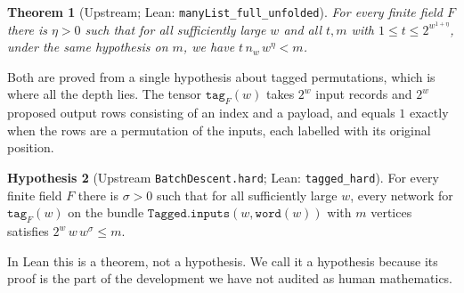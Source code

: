 \documentclass[11pt]{amsart}
\newtheorem{theorem}{Theorem}[section]
\theoremstyle{definition}
\newtheorem{hypothesis}[theorem]{Hypothesis}
\theoremstyle{remark}
\newcommand{\lean}[1]{\texttt{#1}}
\begin{document}
\begin{theorem}[Upstream; Lean: \lean{manyList\_full\_unfolded}]
For every finite field $F$ there is $\eta>0$ such that for all sufficiently large $w$ and all $t,m$ with $1\le t\le 2^{w^{1+\eta}}$, under the same hypothesis on $m$, we have $t\,n_w\,w^{\eta}<m$.
\end{theorem}

Both are proved from a single hypothesis about tagged permutations, which is where all the depth lies. The tensor $\mathtt{tag}_F(w)$ takes $2^w$ input records and $2^w$ proposed output rows consisting of an index and a payload, and equals $1$ exactly when the rows are a permutation of the inputs, each labelled with its original position.

\begin{hypothesis}[Upstream \lean{BatchDescent.hard}; Lean: \lean{tagged\_hard}]\label{hyp:hard}
For every finite field $F$ there is $\sigma>0$ such that for all sufficiently large $w$, every network for $\mathtt{tag}_F(w)$ on the bundle $\mathtt{Tagged.inputs}(w,\mathtt{word}(w))$ with $m$ vertices satisfies $2^w\,w\,w^{\sigma}\le m$.
\end{hypothesis}

In Lean this is a theorem, not a hypothesis. We call it a hypothesis because its proof is the part of the development we have not audited as human mathematics.
\end{document}
